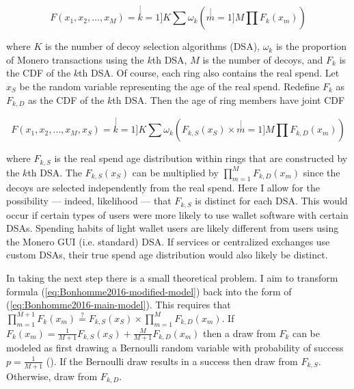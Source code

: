 \documentclass[english]{article}
\begin{document}
\begin{equation}
F(x_{1},x_{2},\ldots,x_{M})=\stackrel[k=1]{K}{\sum}\omega_{k}\left(\stackrel[m=1]{M}{\prod}F_{k}(x_{m})\right)\label{eq:Bonhomme2016-main-model}
\end{equation}

where $K$ is the number of decoy selection algorithms (DSA), $\omega_{k}$
is the proportion of Monero transactions using the $k$th DSA, $M$
is the number of decoys, and $F_{k}$ is the CDF of the $k$th DSA.
Of course, each ring also contains the real spend. Let $x_{S}$ be
the random variable representing the age of the real spend. Redefine
$F_{k}$ as $F_{k,D}$ as the CDF of the $k$th DSA. Then the age
of ring members have joint CDF

\begin{equation}
F(x_{1},x_{2},\ldots,x_{M},x_{S})=\stackrel[k=1]{K}{\sum}\omega_{k}\left(F_{k,S}(x_{S})\times\stackrel[m=1]{M}{\prod}F_{k,D}(x_{m})\right)\label{eq:Bonhomme2016-modified-model}
\end{equation}

where $F_{k,S}$ is the real spend age distribution within rings that
are constructed by the $k$th DSA. The $F_{k,S}(x_{S})$ can be multiplied
by $\prod_{m=1}^{M}F_{k,D}(x_{m})$ since the decoys are selected
independently from the real spend. Here I allow for the possibility
--- indeed, likelihood --- that $F_{k,S}$ is distinct for each
DSA. This would occur if certain types of users were more likely to
use wallet software with certain DSAs. Spending habits of light wallet
users are likely different from users using the Monero GUI (i.e. standard)
DSA. If services or centralized exchanges use custom DSAs, their true
spend age distribution would also likely be distinct.

In taking the next step there is a small theoretical problem. I aim
to transform formula (\ref{eq:Bonhomme2016-modified-model}) back
into the form of (\ref{eq:Bonhomme2016-main-model}). This requires
that $\prod_{m=1}^{M+1}F_{k}(x_{m})\overset{?}{=}F_{k,S}(x_{S})\times\prod_{m=1}^{M}F_{k,D}(x_{m})$.
If $F_{k}(x_{m})=\frac{1}{M+1}F_{k,S}(x_{S})+\frac{M}{M+1}F_{k,D}(x_{m})$
then a draw from $F_{k}$ can be modeled as first drawing a Bernoulli
random variable with probability of success $p=\frac{1}{M+1}$ (\cite{McLachlan2019}).
If the Bernoulli draw results in a success then draw from $F_{k,S}$.
Otherwise, draw from $F_{k,D}$. 
\end{document}
